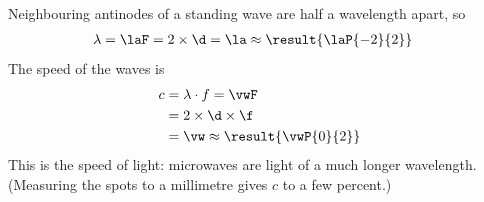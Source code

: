 Neighbouring antinodes of a standing wave are half a wavelength apart, so
\begin{align}
 \lambda &= \laF = 2\times\d = \la \approx \result{\laP{-2}{2}}
\end{align}
The speed of the waves is
\begin{align}
 c &= \lambda\cdot f = \vwF \\
   &= 2\times\d\times\f \\
   &= \vw \approx \result{\vwP{0}{2}}
\end{align}
This is the speed of light: microwaves are light of a much longer wavelength. (Measuring the spots to a millimetre gives $c$ to a few percent.)
